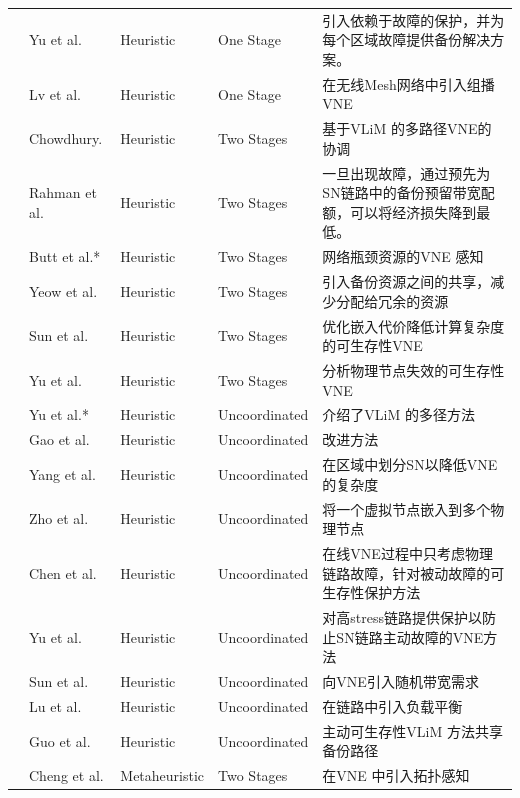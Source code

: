 \begin{longtable}[h]{@{}lm{}m{}m{}m{}}
 & Yu et al.  \cite{yu2010survivable}  & Heuristic & One Stage & 引入依赖于故障的保护，并为每个区域故障提供备份解决方案。\\
 & Lv et al.  \cite{lv2012multicast}  & Heuristic & One Stage & 在无线Mesh网络中引入组播VNE\\
 & Chowdhury.\cite{chowdhury2012vineyard,chowdhury2009virtual}  & Heuristic & Two Stages & 基于VLiM 的多路径VNE的协调\\
 & Rahman et al.  \cite{rahman2010survivable}  & Heuristic & Two Stages & 一旦出现故障，通过预先为SN链路中的备份预留带宽配额，可以将经济损失降到最低。\\
 & Butt et al.*  \cite{butt2010topology}  & Heuristic & Two Stages & 网络瓶颈资源的VNE 感知\\
 & Yeow et al.  \cite{yeow2010designing}  & Heuristic & Two Stages & 引入备份资源之间的共享，减少分配给冗余的资源\\
 & Sun et al.  \cite{sun2011framework}  & Heuristic &  Two Stages & 优化嵌入代价降低计算复杂度的可生存性VNE\\
 & Yu et al.  \cite{yu2011cost}  & Heuristic & Two Stages & 分析物理节点失效的可生存性VNE\\
 & Yu et al.*  \cite{yu2008rethinking}  & Heuristic & Uncoordinated & 介绍了VLiM 的多径方法\\
 & Gao et al.  \cite{gao2010new}  & Heuristic & Uncoordinated & 改进方法\cite{chowdhury2009virtual} \\
 & Yang et al.  \cite{yang2010vlb}  & Heuristic & Uncoordinated & 在区域中划分SN以降低VNE的复杂度\\
 & Zho et al.  \cite{zhou2010virtual}  & Heuristic & Uncoordinated & 将一个虚拟节点嵌入到多个物理节点
\\
 & Chen et al.  \cite{chen2010resilient}  & Heuristic & Uncoordinated & 在线VNE过程中只考虑物理链路故障，针对被动故障的可生存性保护方法\\
 & Yu et al.  \cite{yang2011rmap}  & Heuristic & Uncoordinated & 对高stress链路提供保护以防止SN链路主动故障的VNE方法\\
 & Sun et al.  \cite{sun2012exploring}  & Heuristic & Uncoordinated & 向VNE引入随机带宽需求\\
 & Lu et al.  \cite{bo2011adaptive}  & Heuristic & Uncoordinated & 在链路中引入负载平衡\\
 & Guo et al.  \cite{guo2011shared}  & Heuristic & Uncoordinated & 主动可生存性VLiM 方法共享备份路径\\
 & Cheng et al.  \cite{cheng2011virtual}  & Metaheuristic & Two Stages & 在VNE 中引入拓扑感知\\

\end{longtable}
